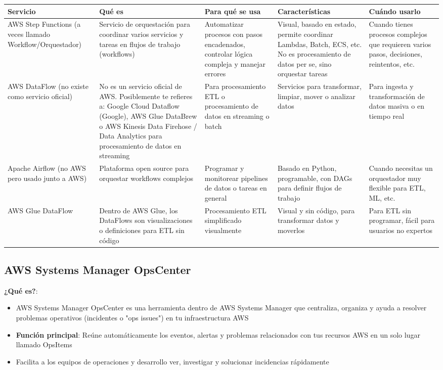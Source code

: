 \documentclass[12pt,a4paper]{report}
\begin{document}
\begin{center}
\begin{longtable}{|p{2.5cm}|p{3.5cm}|p{3cm}|p{3cm}|p{3cm}|}
\hline
\cellcolor{awsblue!20}\textbf{Servicio} & \cellcolor{awsblue!20}\textbf{Qué es} & \cellcolor{awsblue!20}\textbf{Para qué se usa} & \cellcolor{awsblue!20}\textbf{Características} & \cellcolor{awsblue!20}\textbf{Cuándo usarlo} \\
\hline
\cellcolor{successgreen!20}AWS Step Functions (a veces llamado Workflow/Orquestador) & Servicio de orquestación para coordinar varios servicios y tareas en flujos de trabajo (workflows) & Automatizar procesos con pasos encadenados, controlar lógica compleja y manejar errores & Visual, basado en estado, permite coordinar Lambdas, Batch, ECS, etc. No es procesamiento de datos per se, sino orquestar tareas & Cuando tienes procesos complejos que requieren varios pasos, decisiones, reintentos, etc. \\
\hline
AWS DataFlow (no existe como servicio oficial) & No es un servicio oficial de AWS. Posiblemente te refieres a: Google Cloud Dataflow (Google), AWS Glue DataBrew o AWS Kinesis Data Firehose / Data Analytics para procesamiento de datos en streaming & Para procesamiento ETL o procesamiento de datos en streaming o batch & Servicios para transformar, limpiar, mover o analizar datos & Para ingesta y transformación de datos masiva o en tiempo real \\
\hline
Apache Airflow (no AWS pero usado junto a AWS) & Plataforma open source para orquestar workflows complejos & Programar y monitorear pipelines de datos o tareas en general & Basado en Python, programable, con DAGs para definir flujos de trabajo & Cuando necesitas un orquestador muy flexible para ETL, ML, etc. \\
\hline
AWS Glue DataFlow & Dentro de AWS Glue, los DataFlows son visualizaciones o definiciones para ETL sin código & Procesamiento ETL simplificado visualmente & Visual y sin código, para transformar datos y moverlos & Para ETL sin programar, fácil para usuarios no expertos \\
\hline
\end{longtable}
\end{center}

\subsection{AWS Systems Manager OpsCenter}

\textbf{¿Qué es?}:
\begin{itemize}
    \item AWS Systems Manager OpsCenter es una herramienta dentro de AWS Systems Manager que centraliza, organiza y ayuda a resolver problemas operativos (incidentes o "ops issues") en tu infraestructura AWS
    \item \textbf{Función principal}: Reúne automáticamente los eventos, alertas y problemas relacionados con tus recursos AWS en un solo lugar llamado OpsItems
    \item Facilita a los equipos de operaciones y desarrollo ver, investigar y solucionar incidencias rápidamente
\end{itemize}
\end{document}
